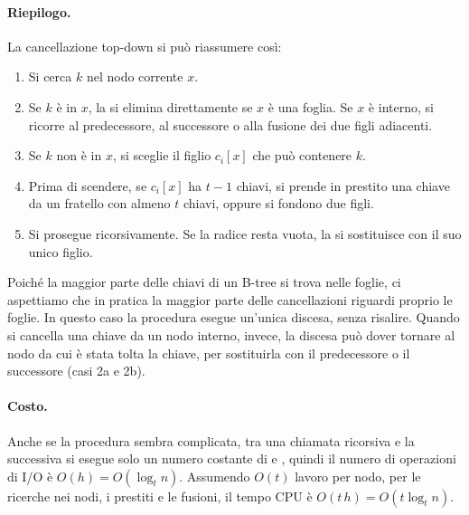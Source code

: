 \paragraph{Riepilogo.}
La cancellazione top-down si può riassumere così:
\begin{enumerate}
    \item Si cerca $k$ nel nodo corrente $x$.
    \item Se $k$ è in $x$, la si elimina direttamente se $x$ è una foglia. Se $x$ è interno, si ricorre al predecessore, al successore o alla fusione dei due figli adiacenti.
    \item Se $k$ non è in $x$, si sceglie il figlio $c_i[x]$ che può contenere $k$.
    \item Prima di scendere, se $c_i[x]$ ha $t-1$ chiavi, si prende in prestito una chiave da un fratello con almeno $t$ chiavi, oppure si fondono due figli.
    \item Si prosegue ricorsivamente. Se la radice resta vuota, la si sostituisce con il suo unico figlio.
\end{enumerate}
Poiché la maggior parte delle chiavi di un B-tree si trova nelle foglie, ci aspettiamo che in pratica la maggior parte delle cancellazioni riguardi proprio le foglie. In questo caso la procedura esegue un'unica discesa, senza risalire. Quando si cancella una chiave da un nodo interno, invece, la discesa può dover tornare al nodo da cui è stata tolta la chiave, per sostituirla con il predecessore o il successore (casi 2a e 2b).

\paragraph{Costo.}
Anche se la procedura sembra complicata, tra una chiamata ricorsiva e la successiva si esegue solo un numero costante di \PageRead{} e \PageWrite{}, quindi il numero di operazioni di I/O è $O(h) = O(\log_t n)$. Assumendo $O(t)$ lavoro per nodo, per le ricerche nei nodi, i prestiti e le fusioni, il tempo CPU è $O(t\,h) = O(t\log_t n)$.

